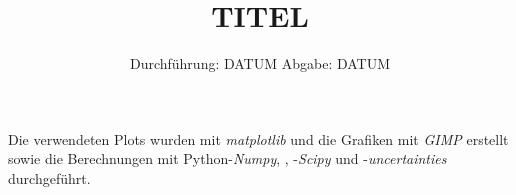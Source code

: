 
\subject{VERSUCH NUMMER}
\title{TITEL}
\date{
  Durchführung: DATUM
  \hspace{3em}
  Abgabe: DATUM
}


\maketitle
\thispagestyle{empty}
\newpage





\printbibliography
\noindent Die verwendeten Plots wurden mit \textit{matplotlib}\cite{matplotlib} und die Grafiken mit \textit{GIMP}\cite{gimp} erstellt sowie die Berechnungen mit Python-\textit{Numpy}, \cite{numpy}, -\textit{Scipy}\cite{scipy} und -\textit{uncertainties}\cite{uncertainties} durchgeführt.
